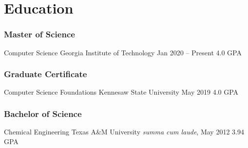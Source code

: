 %
%
%
%
\section{Education}
  \subsubsection{Master of Science} 
  \school%
    {Computer Science}%
    {Georgia Institute of Technology}%
    {Jan 2020 -- Present}%
    {4.0 GPA}
  \subsubsection{Graduate Certificate}
  \school%
    {Computer Science Foundations}%
    {Kennesaw State University}%
    {May 2019}%
    {4.0 GPA}
  \subsubsection{Bachelor of Science}
  \school%
    {Chemical Engineering}%
    {Texas A\&M University}%
    {\textit{summa cum laude}, May 2012}%
    {3.94 GPA}
%
%
%
